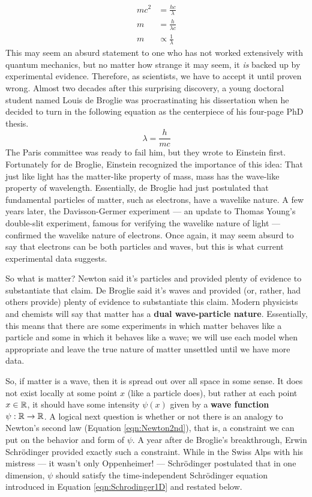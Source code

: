 \documentclass[titlepage]{article}
\numberwithin{equation}{section}
\begin{document}
\begin{align*}
    mc^2 &= \frac{hc}{\lambda}\\
    m &= \frac{h}{\lambda c}\\
    m &\propto \frac{1}{\lambda}
\end{align*}
This may seem an absurd statement to one who has not worked extensively with quantum mechanics, but no matter how strange it may seem, it \emph{is} backed up by experimental evidence. Therefore, as scientists, we have to accept it until proven wrong. Almost two decades after this surprising discovery, a young doctoral student named Louis de Broglie was procrastinating his dissertation when he decided to turn in the following equation as the centerpiece of his four-page PhD thesis.
\begin{equation*}
    \lambda = \frac{h}{mc}
\end{equation*}
The Paris committee was ready to fail him, but they wrote to Einstein first. Fortunately for de Broglie, Einstein recognized the importance of this idea: That just like light has the matter-like property of mass, mass has the wave-like property of wavelength. Essentially, de Broglie had just postulated that fundamental particles of matter, such as electrons, have a wavelike nature. A few years later, the Davisson-Germer experiment --- an update to Thomas Young's double-slit experiment, famous for verifying the wavelike nature of light --- confirmed the wavelike nature of electrons. Once again, it may seem absurd to say that electrons can be both particles and waves, but this is what current experimental data suggests.\par
So what is matter? Newton said it's particles and provided plenty of evidence to substantiate that claim. De Broglie said it's waves and provided (or, rather, had others provide) plenty of evidence to substantiate this claim. Modern physicists and chemists will say that matter has a \textbf{dual wave-particle nature}. Essentially, this means that there are some experiments in which matter behaves like a particle and some in which it behaves like a wave; we will use each model when appropriate and leave the true nature of matter unsettled until we have more data.\par
So, if matter is a wave, then it is spread out over all space in some sense. It does not exist locally at some point $x$ (like a particle does), but rather at each point $x\in\mathbb{R}$, it should have some intensity $\psi(x)$ given by a \textbf{wave function} $\psi:\mathbb{R}\to\mathbb{R}$. A logical next question is whether or not there is an analogy to Newton's second law (Equation \ref{eqn:Newton2nd}), that is, a constraint we can put on the behavior and form of $\psi$. A year after de Broglie's breakthrough, Erwin Schr\"{o}dinger provided exactly such a constraint. While in the Swiss Alps with his mistress --- it wasn't only Oppenheimer! --- Schr\"{o}dinger postulated that in one dimension, $\psi$ should satisfy the time-independent Schr\"{o}dinger equation introduced in Equation \ref{eqn:Schrodinger1D} and restated below.
\end{document}
